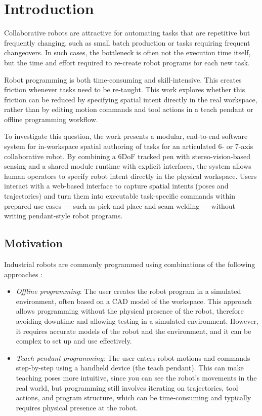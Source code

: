 \chapter*{Introduction}

Collaborative robots are attractive for automating tasks that are repetitive but frequently changing, such as small batch production or tasks requiring frequent changeovers. In such cases, the bottleneck is often not the execution time itself, but the time and effort required to re-create robot programs for each new task.

Robot programming is both time-consuming \cite{IFR2023TraditionalVsNew} and skill-intensive. This creates friction whenever tasks need to be re-taught. This work explores whether this friction can be reduced by specifying spatial intent directly in the real workspace, rather than by editing motion commands and tool actions in a teach pendant or offline programming workflow.

To investigate this question, the work presents a modular, end-to-end software system for in-workspace spatial authoring of tasks for an articulated 6- or 7-axis collaborative robot. By combining a 6DoF tracked pen with stereo-vision-based sensing and a shared module runtime with explicit interfaces, the system allows human operators to specify robot intent directly in the physical workspace. Users interact with a web-based interface to capture spatial intents (poses and trajectories) and turn them into executable task-specific commands within prepared use cases --- such as pick-and-place and seam welding --- without writing pendant-style robot programs.


\section*{Motivation}

Industrial robots are commonly programmed using combinations of the following approaches \cite{VILLANI201866}:
\begin{itemize}
    \item \emph{Offline programming}: The user creates the robot program in a simulated environment, often based on a CAD model of the workspace. This approach allows programming without the physical presence of the robot, therefore avoiding downtime and allowing testing in a simulated environment. However, it requires accurate models of the robot and the environment, and it can be complex to set up and use effectively.
    \item \emph{Teach pendant programming}: The user enters robot motions and commands step-by-step using a handheld device (the teach pendant). This can make teaching poses more intuitive, since you can see the robot's movements in the real world, but programming still involves iterating on trajectories, tool actions, and program structure, which can be time-consuming and typically requires physical presence at the robot.
\end{itemize}

